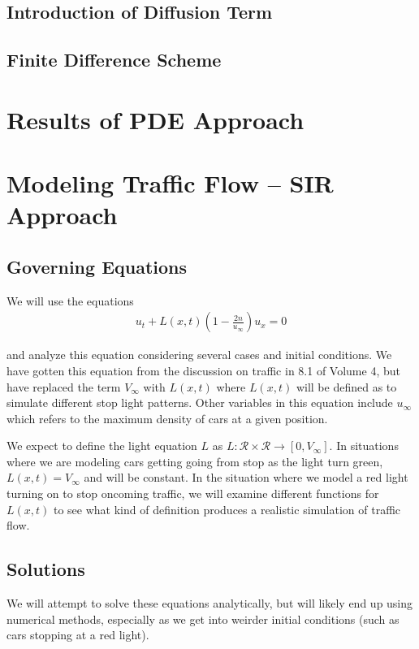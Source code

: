 \documentclass[12pt]{article}
\begin{document}
\subsection{Introduction of Diffusion Term}
    

\subsection{Finite Difference Scheme}

\section{Results of PDE Approach}

\section{Modeling Traffic Flow – SIR Approach}

\subsection{Governing Equations} 
We will use the equations 
\begin{align*}
    u_t + L(x, t) ( 1 - \frac{2n}{u_\infty} ) u_x = 0 
\end{align*}

and analyze this equation considering several cases and initial conditions. We have gotten this equation from the discussion on traffic in 8.1 of Volume 4, but have replaced the term $V_\infty$ with $L(x, t)$ where $L(x, t)$ will be defined as to simulate different stop light patterns. Other variables in this equation include $u_\infty$ which refers to the maximum density of cars at a given position. 

We expect to define the light equation $L$ as $L : \mathcal{R} \times \mathcal{R} \to [0, V_\infty]$. In situations where we are modeling cars getting going from stop as the light turn green, $L(x, t) = V_\infty$ and will be constant. In the situation where we model a red light turning on to stop oncoming traffic, we will examine different functions for $L(x, t)$ to see what kind of definition produces a realistic simulation of traffic flow. 

\subsection{Solutions}

We will attempt to solve these equations analytically, but will likely end up using numerical methods, especially as we get into weirder initial conditions (such as cars stopping at a red light). 
\end{document}
